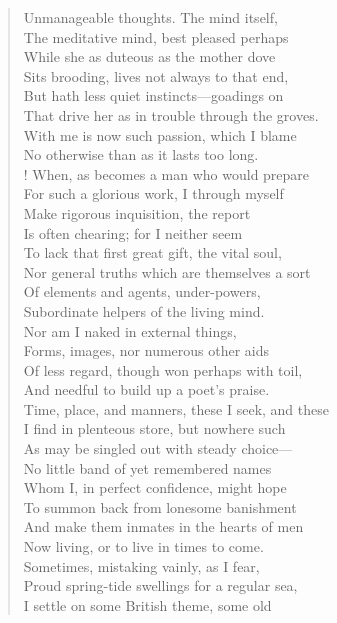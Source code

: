 \begin{verse}
Unmanageable thoughts. The mind itself,  \\
The meditative mind, best pleased perhaps	  \\
While she as duteous as the mother dove  \\
Sits brooding, lives not always to that end,  \\
But hath less quiet instincts---goadings on  \\
That drive her as in trouble through the groves.  \\
With me is now such passion, which I blame	  \\
No otherwise than as it lasts too long.  \\!
When, as becomes a man who would prepare  \\
For such a glorious work, I through myself  \\
Make rigorous inquisition, the report	  \\
Is often chearing; for I neither seem  \\
To lack that first great gift, the vital soul,  \\
Nor general truths which are themselves a sort  \\
Of elements and agents, under-powers,  \\
Subordinate helpers of the living mind.	  \\
Nor am I naked in external things,  \\
Forms, images, nor numerous other aids  \\
Of less regard, though won perhaps with toil,  \\
And needful to build up a poet's praise.  \\
Time, place, and manners, these I seek, and these	  \\
I find in plenteous store, but nowhere such  \\
As may be singled out with steady choice---  \\
No little band of yet remembered names  \\
Whom I, in perfect confidence, might hope  \\
To summon back from lonesome banishment	  \\
And make them inmates in the hearts of men  \\
Now living, or to live in times to come.  \\
Sometimes, mistaking vainly, as I fear,  \\
Proud spring-tide swellings for a regular sea,  \\
I settle on some British theme, some old	  \\

\end{verse}
